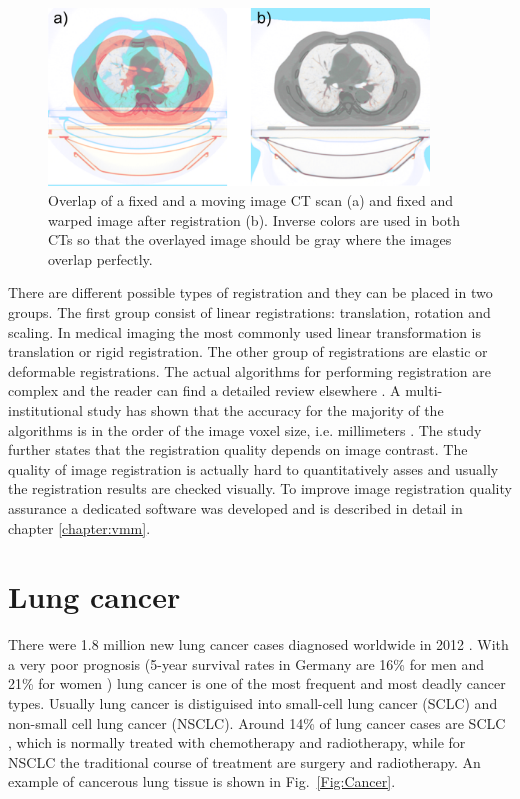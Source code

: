 \begin{figure}[H]
\begin{center}
\includegraphics[width=0.9\textwidth]{./Fundamentals/Images/RegistrationCompare.png}
\caption{Overlap of a fixed and a moving image CT scan (a) and fixed and warped image after registration (b). Inverse colors are used in both CTs so that the overlayed image should be gray
where the images overlap perfectly.}
\label{RegistrationCompare}
\end{center}
\end{figure}

There are different possible types of registration and they can be placed in two groups. The first group consist of linear registrations: translation, rotation and scaling. In medical imaging the most commonly used linear transformation 
is translation or rigid registration. The other group of registrations are elastic or deformable registrations. The actual algorithms for performing registration are complex and the reader can
find a detailed review elsewhere \cite{Hill2001,Brock2006,Rietzel2006a}. A multi-institutional study has shown that the accuracy for the majority of the algorithms is in the order of the image voxel
size, i.e. millimeters \cite{Brock2010}. The study further states that the registration quality depends on image contrast. The quality of image registration is actually hard to quantitatively
asses and usually the registration results are checked visually. To improve image registration quality assurance a dedicated software was developed and is described in detail in chapter \ref{chapter:vmm}.

\newpage




\section{Lung cancer}

There were 1.8 million new lung cancer cases diagnosed worldwide in 2012 \cite{Worldwide2012}. With a very poor prognosis (5-year survival rates in Germany are
16\% for men and 21\% for women \cite{Kaatsch2014}) lung cancer is one of the most frequent and most deadly cancer types. Usually lung cancer is distiguised
into small-cell lung cancer (SCLC) and non-small cell lung cancer (NSCLC). Around 14\% of lung cancer cases are SCLC \cite{Tsao2008}, which is normally treated with chemotherapy and radiotherapy, while for NSCLC the traditional course of treatment
are surgery and radiotherapy. An example of cancerous lung tissue is shown in Fig.~\ref{Fig:Cancer}.

